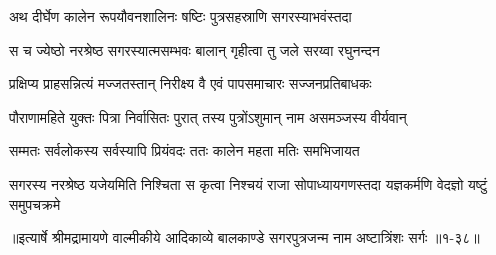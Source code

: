 \twolineshloka
{अथ दीर्घेण कालेन रूपयौवनशालिनः}
{षष्टिः पुत्रसहस्राणि सगरस्याभवंस्तदा} %

\twolineshloka
{स च ज्येष्ठो नरश्रेष्ठ सगरस्यात्मसम्भवः}
{बालान् गृहीत्वा तु जले सरय्वा रघुनन्दन} %

\twolineshloka
{प्रक्षिप्य प्राहसन्नित्यं मज्जतस्तान् निरीक्ष्य वै}
{एवं पापसमाचारः सज्जनप्रतिबाधकः} %

\twolineshloka
{पौराणामहिते युक्तः पित्रा निर्वासितः पुरात्}
{तस्य पुत्रोंऽशुमान् नाम असमञ्जस्य वीर्यवान्} %

\twolineshloka
{सम्मतः सर्वलोकस्य सर्वस्यापि प्रियंवदः}
{ततः कालेन महता मतिः समभिजायत} %

\threelineshloka
{सगरस्य नरश्रेष्ठ यजेयमिति निश्चिता}
{स कृत्वा निश्चयं राजा सोपाध्यायगणस्तदा}
{यज्ञकर्मणि वेदज्ञो यष्टुं समुपचक्रमे} %


॥इत्यार्षे श्रीमद्रामायणे वाल्मीकीये आदिकाव्ये बालकाण्डे सगरपुत्रजन्म नाम अष्टात्रिंशः सर्गः ॥१-३८॥
